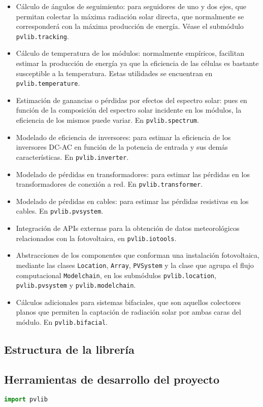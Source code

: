 \begin{itemize}
      \item Cálculo de ángulos de seguimiento: para seguidores de uno y dos ejes, que permitan colectar la máxima radiación solar directa, que normalmente se corresponderá con la máxima producción de energía. Véase el submódulo \lstinline{pvlib.tracking}.
      \item Cálculo de temperatura de los módulos: normalmente empíricos, facilitan estimar la producción de energía ya que la eficiencia de las células es bastante susceptible a la temperatura. Estas utilidades se encuentran en \lstinline{pvlib.temperature}.
      \item Estimación de ganancias o pérdidas por efectos del espectro solar: pues en función de la composición del espectro solar incidente en los módulos, la eficiencia de los mismos puede variar. En \lstinline{pvlib.spectrum}.
      \item Modelado de eficiencia de inversores: para estimar la eficiencia de los inversores DC-AC en función de la potencia de entrada y sus demás características. En \lstinline{pvlib.inverter}.
      \item Modelado de pérdidas en transformadores: para estimar las pérdidas en los transformadores de conexión a red. En \lstinline{pvlib.transformer}.
      \item Modelado de pérdidas en cables: para estimar las pérdidas resistivas en los cables. En \lstinline{pvlib.pvsystem}.
      \item Integración de APIs externas para la obtención de datos meteorológicos relacionados con la fotovoltaica, en \lstinline{pvlib.iotools}.
      \item Abstracciones de los componentes que conforman una instalación fotovoltaica, mediante las clases \lstinline{Location}, \lstinline{Array}, \lstinline{PVSystem} y la clase que agrupa el flujo computacional \lstinline{Modelchain}, en los submódulos \lstinline{pvlib.location}, \lstinline{pvlib.pvsystem} y \lstinline{pvlib.modelchain}.
      \item Cálculos adicionales para sistemas bifaciales, que son aquellos colectores planos que permiten la captación de radiación solar por ambas caras del módulo. En \lstinline{pvlib.bifacial}.

\end{itemize}

\subsection{Estructura de la librería} \label{ssct:pvlib:estructura}

\subsection{Herramientas de desarrollo del proyecto} \label{ssct:pvlib:herramientas}

\begin{lstlisting}[language=Python]
import pvlib

\end{lstlisting}
